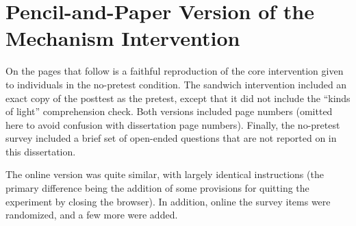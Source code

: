 \graphicspath{{appendices/mech-intervention}}
\chapter{Pencil-and-Paper Version of the Mechanism Intervention}
\label{app:mech-format}

On the pages that follow is a faithful reproduction of the core intervention
given to individuals in the no-pretest condition. The sandwich intervention
included an exact copy of the posttest as the pretest, except that it did
not include the “kinds of light” comprehension check. Both versions included
page numbers (omitted here to avoid confusion with dissertation page numbers).
Finally, the no-pretest survey included a brief set of open-ended questions that
are not reported on in this dissertation.

The online version was quite similar, with largely identical instructions (the
primary difference being the addition of some provisions for quitting the
experiment by closing the browser). In addition, online the survey items were
randomized, and a few more were added.


